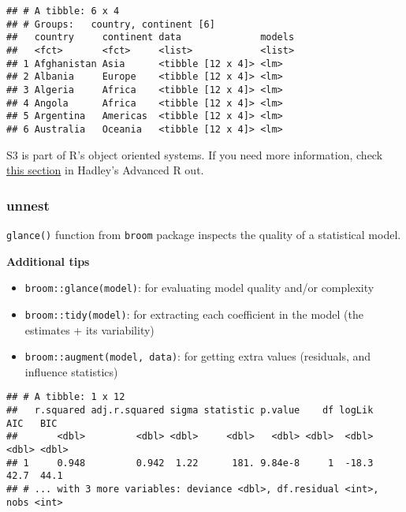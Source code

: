 \documentclass[
]{book}
\newenvironment{Shaded}{\begin{snugshade}}{\end{snugshade}}
\newcommand{\DataTypeTok}[1]{\textcolor[rgb]{0.13,0.29,0.53}{#1}}
\newcommand{\DecValTok}[1]{\textcolor[rgb]{0.00,0.00,0.81}{#1}}
\newcommand{\KeywordTok}[1]{\textcolor[rgb]{0.13,0.29,0.53}{\textbf{#1}}}
\newcommand{\NormalTok}[1]{#1}
\newcommand{\OperatorTok}[1]{\textcolor[rgb]{0.81,0.36,0.00}{\textbf{#1}}}
\newcommand{\StringTok}[1]{\textcolor[rgb]{0.31,0.60,0.02}{#1}}
\providecommand{\tightlist}{%
  \setlength{\itemsep}{0pt}\setlength{\parskip}{0pt}}
\begin{document}
\begin{verbatim}
## # A tibble: 6 x 4
## # Groups:   country, continent [6]
##   country     continent data              models
##   <fct>       <fct>     <list>            <list>
## 1 Afghanistan Asia      <tibble [12 x 4]> <lm>  
## 2 Albania     Europe    <tibble [12 x 4]> <lm>  
## 3 Algeria     Africa    <tibble [12 x 4]> <lm>  
## 4 Angola      Africa    <tibble [12 x 4]> <lm>  
## 5 Argentina   Americas  <tibble [12 x 4]> <lm>  
## 6 Australia   Oceania   <tibble [12 x 4]> <lm>
\end{verbatim}

S3 is part of R's object oriented systems. If you need more information, check \href{http://adv-r.had.co.nz/S3.html}{this section} in Hadley's Advanced R out.

\hypertarget{unnest}{%
\subsubsection{unnest}\label{unnest}}

\texttt{glance()} function from \texttt{broom} package inspects the quality of a statistical model.

\textbf{Additional tips}

\begin{itemize}
\tightlist
\item
  \texttt{broom::glance(model)}: for evaluating model quality and/or complexity
\item
  \texttt{broom::tidy(model)}: for extracting each coefficient in the model (the estimates + its variability)
\item
  \texttt{broom::augment(model,\ data)}: for getting extra values (residuals, and influence statistics)
\end{itemize}

\begin{Shaded}
\end{Shaded}

\begin{verbatim}
## # A tibble: 1 x 12
##   r.squared adj.r.squared sigma statistic p.value    df logLik   AIC   BIC
##       <dbl>         <dbl> <dbl>     <dbl>   <dbl> <dbl>  <dbl> <dbl> <dbl>
## 1     0.948         0.942  1.22      181. 9.84e-8     1  -18.3  42.7  44.1
## # ... with 3 more variables: deviance <dbl>, df.residual <int>, nobs <int>
\end{verbatim}
\end{document}
